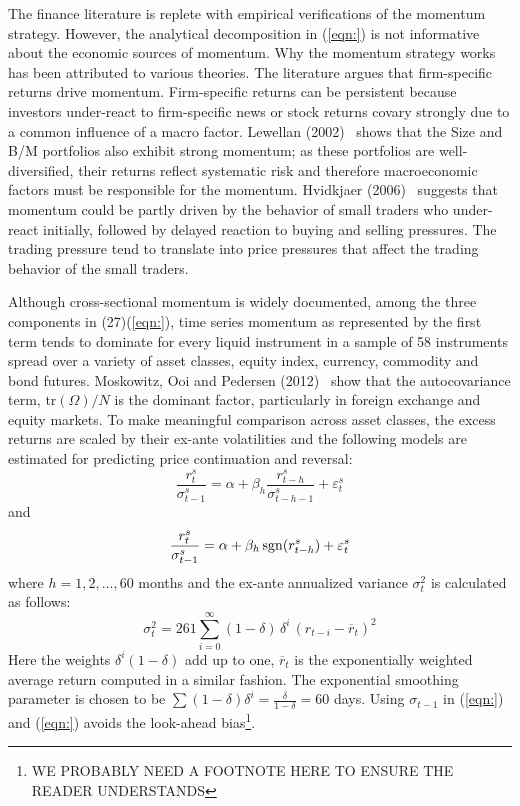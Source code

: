 The finance literature is replete with empirical verifications of the momentum strategy. However, the analytical decomposition in (\ref{eqn:}) is not informative about the economic sources of momentum. Why the momentum strategy works has been attributed to various theories. The literature argues that firm-specific returns drive momentum. Firm-specific returns can be persistent because investors under-react to firm-specific news or stock returns covary strongly due to a common influence of a macro factor. Lewellan (2002)~\cite{lew2002} shows that the Size and B/M portfolios also exhibit strong momentum; as these portfolios are well-diversified, their returns reflect systematic risk and therefore macroeconomic factors must be responsible for the momentum. Hvidkjaer (2006)~\cite{hvid2006} suggests that momentum could be partly driven by the behavior of small traders who under-react initially, followed by delayed reaction to buying and selling pressures. The trading pressure tend to translate into price pressures that affect the trading behavior of the small traders.


Although cross-sectional momentum is widely documented, among the three components in (27)(\ref{eqn:}), time series momentum as represented by the first term tends to dominate for every liquid instrument in a sample of 58 instruments spread over a variety of asset classes, equity index, currency, commodity and bond futures. Moskowitz, Ooi and Pedersen (2012)~\cite{mos2012} show that the autocovariance term, $\text{tr}(\Omega)/N$ is the dominant factor, particularly in foreign exchange and equity markets. To make meaningful comparison across asset classes, the excess returns are scaled by their ex-ante volatilities and the following models are estimated for predicting price continuation and reversal:
	\begin{equation}
	\frac{r_t^s}{\sigma_{t-1}^s} = \alpha + \beta_h \dfrac{r_{t-h}^s}{\sigma_{t-h-1}^s} + \varepsilon_t^s
	\end{equation}
and
	\begin{equation}
	\frac{r_t^s}{\sigma_{t-1}^s} = \alpha + \beta_h \operatorname{sgn}(r_{t-h}^s) + \varepsilon_t^s
	\end{equation}
where $h= 1,2,\ldots,60$ months and the ex-ante annualized variance $\sigma_t^2$ is calculated as follows:
	\begin{equation}
	\sigma_t^2 = 261 \sum_{i=0}^\infty (1-\delta)\,\delta^i \,(r_{t-i} - \overline{r}_t)^2
	\end{equation}
Here the weights $\delta^i (1 - \delta)$ add up to one, $\overline{r}_t$ is the exponentially weighted average return computed in a similar fashion. The exponential smoothing parameter is chosen to be $\sum(1-\delta)\delta^i = \frac{\delta}{1-\delta} = 60$ days. Using $\sigma_{t-1}$ in (\ref{eqn:}) and (\ref{eqn:}) avoids the look-ahead bias\footnote{WE PROBABLY NEED A FOOTNOTE HERE TO ENSURE THE READER UNDERSTANDS}.


